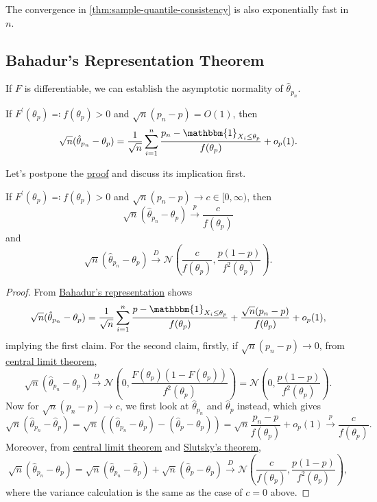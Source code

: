 \begin{note}
	The convergence in \autoref{thm:sample-quantile-consistency} is also exponentially fast in \(n\).
\end{note}

\subsection{Bahadur's Representation Theorem}
If \(F\) is differentiable, we can establish the asymptotic normality of \(\hat{\theta} _{p_n}\).

\begin{theorem}\label{thm:Bahadur-representation}
	If \(F^{\prime} (\theta _p) \eqqcolon f(\theta _p) > 0\) and \(\sqrt{n} (p_n - p) = O(1)\), then
	\[
		\sqrt{n} (\hat{\theta} _{p_n} - \theta _p)
		= \frac{1}{\sqrt{n} } \sum_{i=1}^{n} \frac{p_n - \mathbbm{1}_{X_i \leq \theta _p}}{f(\theta _p)} + o_p(1).
	\]
\end{theorem}

Let's postpone the \hyperref[pf:Bahadur-representation]{proof} and discuss its implication first.

\begin{corollary}\label{col:Bahadur-representation}
	If \(F^{\prime} (\theta _p) \eqqcolon f(\theta _p) > 0\) and \(\sqrt{n} (p_n - p) \to c \in [0, \infty )\), then
	\[
		\sqrt{n} (\hat{\theta} _{p_n} - \theta _p) \overset{p}{\to} \frac{c}{f(\theta _p)}
	\]
	and
	\[
		\sqrt{n} (\hat{\theta} _{p_n} - \theta _p) \overset{D}{\to} \mathcal{N} \left( \frac{c}{f(\theta _p)} , \frac{p(1-p)}{f^2(\theta _p)} \right) .
	\]
\end{corollary}
\begin{proof}
	From \hyperref[thm:Bahadur-representation]{Bahadur's representation} shows
	\[
		\sqrt{n} (\hat{\theta} _{p_n} - \theta _p)
		= \frac{1}{\sqrt{n} } \sum_{i=1}^{n} \frac{p - \mathbbm{1}_{X_i \leq \theta _p} }{f(\theta _p)} + \frac{\sqrt{n} (p_n - p)}{f(\theta _p)} + o_p(1),
	\]
	implying the first claim. For the second claim, firstly, if \(\sqrt{n} (p_n - p) \to 0\), from \hyperref[thm:CLT]{central limit theorem},
	\[
		\sqrt{n} (\hat{\theta} _{p_n} - \theta _p)
		\overset{D}{\to} \mathcal{N} \left( 0, \frac{F(\theta _p) (1 - F(\theta _p))}{f^2(\theta _p)} \right)
		= \mathcal{N} \left( 0, \frac{p (1 - p)}{f^2(\theta _p)} \right) .
	\]
	Now for \(\sqrt{n} (p_n - p) \to c\), we first look at \(\hat{\theta} _{p_n}\) and \(\hat{\theta} _p\) instead, which gives
	\[
		\sqrt{n} (\hat{\theta} _{p_n} - \hat{\theta} _p)
		= \sqrt{n} \left( (\hat{\theta} _{p_n} - \theta _p) - (\hat{\theta} _p - \theta _p) \right)
		= \sqrt{n} \frac{p_n - p}{f(\theta _p)} + o_p(1)
		\overset{p}{\to} \frac{c}{f(\theta _p)}.
	\]
	Moreover, from \hyperref[thm:CLT]{central limit theorem} and \hyperref[thm:Slutsky]{Slutsky's theorem},
	\[
		\sqrt{n} (\hat{\theta} _{p_n} - \theta _p)
		= \sqrt{n} (\hat{\theta} _{p_n} - \hat{\theta} _p) + \sqrt{n} (\hat{\theta} _p - \theta _p)
		\overset{D}{\to} \mathcal{N} \left( \frac{c}{f(\theta _p)} , \frac{p(1 - p)}{f^2(\theta _p)} \right),
	\]
	where the variance calculation is the same as the case of \(c = 0\) above.
\end{proof}

